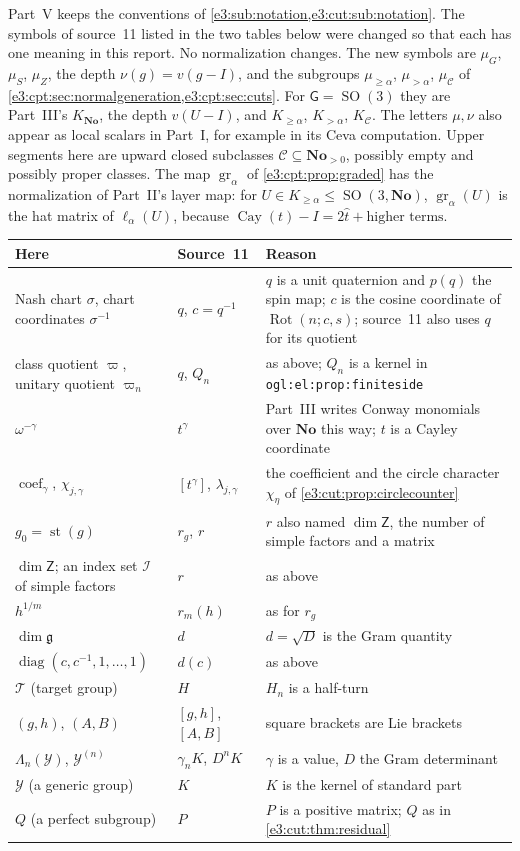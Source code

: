 \documentclass[11pt,letterpaper]{article}
\numberwithin{equation}{section}
\theoremstyle{definition}
\theoremstyle{remark}
\newcommand{\No}{\mathbf{No}}
\newcommand{\st}{\operatorname{st}}
\newcommand{\SO}{\operatorname{SO}}
\newcommand{\cay}{\operatorname{Cay}}
\newcommand{\Rot}{\operatorname{Rot}}
\newcommand{\diag}{\operatorname{diag}}
\newcommand{\comm}[2]{\left(#1,#2\right)}
\newcommand{\coef}{\operatorname{coef}}
\newcommand{\sG}{\mathsf G}
\newcommand{\sZ}{\mathsf Z}
\begin{document}
Part~V keeps the conventions of \cref{e3:sub:notation,e3:cut:sub:notation}.
The symbols of source~11 listed in the two tables below were changed so that
each has one meaning in this report. No normalization changes. The new symbols
are $\mu_G$, $\mu_S$, $\mu_Z$, the depth $\nu(g)=v(g-I)$, and the subgroups $\mu_{\ge\alpha}$, $\mu_{>\alpha}$,
$\mu_{\mathcal C}$ of \cref{e3:cpt:sec:normalgeneration,e3:cpt:sec:cuts}. For
$\sG=\SO(3)$ they are Part~III's $K_{\No}$, the depth $v(U-I)$, and
$K_{\ge\alpha}$, $K_{>\alpha}$, $K_{\mathcal C}$. The letters $\mu,\nu$ also
appear as local scalars in Part~I, for example in its Ceva computation. Upper
segments here are upward closed subclasses $\mathcal C\subseteq\No_{>0}$, possibly empty and
possibly proper classes. The map $\operatorname{gr}_\alpha$ of
\cref{e3:cpt:prop:graded} has the normalization of Part~II's layer map: for
$U\in K_{\ge\alpha}\le\SO(3,\No)$, $\operatorname{gr}_\alpha(U)$ is the hat matrix
of $\ell_\alpha(U)$, because $\cay(t)-I=2\widehat t+\text{higher terms}$.
\begin{center}\small
\begin{tabular}{L{0.27\textwidth}L{0.23\textwidth}L{0.4\textwidth}}
\toprule
Here & Source~11 & Reason\\
\midrule
Nash chart $\sigma$, chart coordinates $\sigma^{-1}$ & $q$, $c=q^{-1}$ &
$q$ is a unit quaternion and $p(q)$ the spin map; $c$ is the cosine coordinate of
$\Rot(n;c,s)$; source~11 also uses $q$ for its quotient\\
class quotient $\varpi$, unitary quotient $\varpi_n$ & $q$, $Q_n$ & as above;
$Q_n$ is a kernel in \texttt{ogl:el:prop:finiteside}\\
$\omega^{-\gamma}$ & $t^\gamma$ & Part~III writes Conway monomials over $\No$
this way; $t$ is a Cayley coordinate\\
$\coef_\gamma$, $\chi_{j,\gamma}$ & $[t^\gamma]$, $\lambda_{j,\gamma}$ & the
coefficient and the circle character $\chi_\eta$ of
\cref{e3:cut:prop:circlecounter}\\
$g_0=\st(g)$ & $r_g$, $r$ & $r$ also named $\dim\sZ$, the number of simple
factors and a matrix\\
$\dim\sZ$; an index set $\mathcal I$ of simple factors & $r$ & as above\\
$h^{1/m}$ & $r_m(h)$ & as for $r_g$\\
$\dim\mathfrak g$ & $d$ & $d=\sqrt D$ is the Gram quantity\\
$\diag(c,c^{-1},1,\ldots,1)$ & $d(c)$ & as above\\
$\mathcal T$ (target group) & $H$ & $H_n$ is a half-turn\\
$\comm gh$, $\comm AB$ & $[g,h]$, $[A,B]$ & square brackets are Lie brackets\\
$\Lambda_n(\mathcal Y)$, $\mathcal Y^{(n)}$ & $\gamma_n K$, $D^nK$ & $\gamma$ is a
value, $D$ the Gram determinant\\
$\mathcal Y$ (a generic group) & $K$ & $K$ is the kernel of standard part\\
$Q$ (a perfect subgroup) & $P$ & $P$ is a positive matrix; $Q$ as in
\cref{e3:cut:thm:residual}\\
\bottomrule
\end{tabular}
\end{center}
\end{document}
